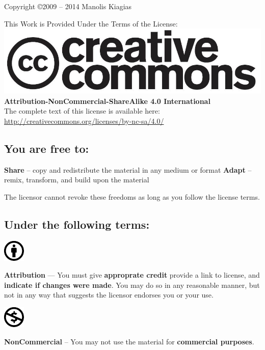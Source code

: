 %
%
\begin{center}
Copyright \copyright 2009 -- 2014 Manolis Kiagias

This Work is Provided Under the Terms of the License:\\
\includegraphics[scale=0.2]{images/license/cc-logo}\\
\textbf{Attribution-NonCommercial-ShareAlike 4.0 International}\\
The complete text of this license is available here:\\
\url{http://creativecommons.org/licenses/by-nc-sa/4.0/}
\end{center}
\subsection*{You are free to:}

\noindent
\textbf{Share} -- copy and redistribute the material in any medium or format
\textbf{Adapt} -- remix, transform, and build upon the material

The licensor cannot revoke these freedoms as long as you follow the license terms.

\subsection*{Under the following terms:}

\vspace{1em}
\noindent
\parbox{1.5cm}{\includegraphics[scale=1.5]{images/license/cc_by_30}}
\parbox{10.5cm}{\textbf{Attribution} — You must give \textbf{approprate credit} provide a link to license, and \textbf{indicate if changes were made}. You may do so in any reasonable manner, but not in any way that suggests the licensor endorses you or your use.}

\vspace{1em}
\noindent
\parbox{1.5cm}{\includegraphics[scale=1.5]{images/license/cc_nc_30}}
\parbox{10.5cm}{\textbf{NonCommercial} --  You may not use the material for \textbf{commercial purposes}.}

